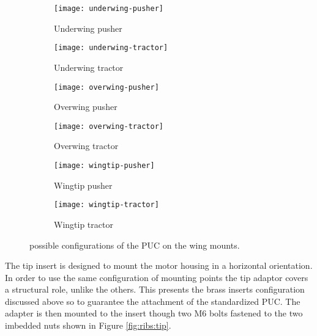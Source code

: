 \documentclass[../../main.tex]{subfiles}
\begin{document}
\begin{figure}[H]
    
    \centering
    \begin{subfigure}[b]{0.49\columnwidth}
        \centering
        \texttt{[image: underwing-pusher]}
        \caption{Underwing pusher}
        \label{fig:wing-mounting:underwing-pusher}
    \end{subfigure}
    \hfill
    \begin{subfigure}[b]{0.49\columnwidth}
        \centering
        \texttt{[image: underwing-tractor]}
        \caption{Underwing tractor}
        \label{fig:wing-mounting:underwing-tractor}
    \end{subfigure}
    
    \centering
    \begin{subfigure}[b]{0.49\columnwidth}
        \centering
        \texttt{[image: overwing-pusher]}
        \caption{Overwing pusher}
        \label{fig:wing-mounting:overwing-pusher}
    \end{subfigure}
    \hfill
    \begin{subfigure}[b]{0.49\columnwidth}
        \centering
        \texttt{[image: overwing-tractor]}
        \caption{Overwing tractor}
        \label{fig:wing-mounting:overwing-tractor}
    \end{subfigure}
    
    \centering
    \begin{subfigure}[b]{0.49\columnwidth}
        \centering
        \texttt{[image: wingtip-pusher]}
        \caption{Wingtip pusher}
        \label{fig:wing-mounting:wingtip-pusher}
    \end{subfigure}
    \hfill
    \begin{subfigure}[b]{0.49\columnwidth}
        \centering
        \texttt{[image: wingtip-tractor]}
        \caption{Wingtip tractor}
        \label{fig:wing-mounting:wingtip-tractor}
    \end{subfigure}
    
    \caption{possible configurations of the PUC on the wing mounts.}
    \label{fig:wing-mounting}
\end{figure}


The tip insert is designed to mount the motor housing in a horizontal orientation.
In order to use the same configuration of mounting points the tip adaptor covers a structural role, unlike the others.
This presents the brass inserts configuration discussed above so to guarantee the attachment of the standardized PUC.  %
The adapter is then mounted to the insert though two M6 bolts fastened to the two imbedded nuts shown in Figure \ref{fig:ribs:tip}. 
\end{document}
